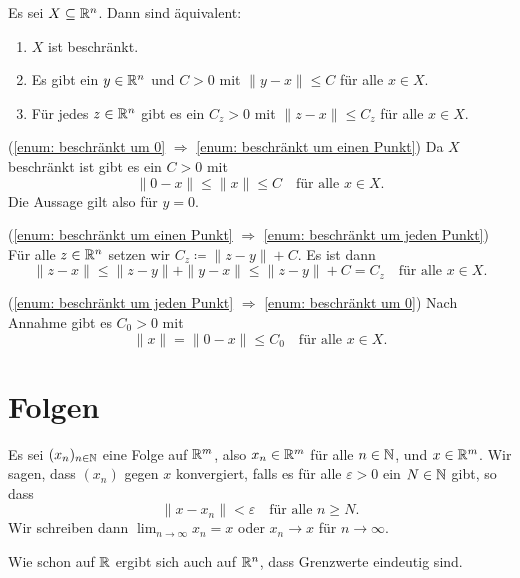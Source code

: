 \documentclass[a4paper,10pt]{article}
\begin{document}
\begin{question}
 Es sei $X \subseteq \mathbb{R}^n$. Dann sind äquivalent:
 \begin{enumerate}
  \item\label{enum: beschränkt um 0}
   $X$ ist beschränkt.
  \item\label{enum: beschränkt um einen Punkt}
   Es gibt ein $y \in \mathbb{R}^n$ und $C > 0$ mit $\|y-x\| \leq C$ für alle $x \in X$.
  \item\label{enum: beschränkt um jeden Punkt}
   Für jedes $z \in \mathbb{R}^n$ gibt es ein $C_z > 0$ mit $\|z-x\| \leq C_z$ für alle $x \in X$.
 \end{enumerate}
\end{question}
\begin{solution}
 (\ref{enum: beschränkt um 0} $\Rightarrow$ \ref{enum: beschränkt um einen Punkt}) Da $X$ beschränkt ist gibt es ein $C > 0$ mit
 \[
  \|0 - x\| \leq \|x\| \leq C
  \quad \text{für alle $x \in X$}.
 \]
 Die Aussage gilt also für $y = 0$.
 
 (\ref{enum: beschränkt um einen Punkt} $\Rightarrow$ \ref{enum: beschränkt um jeden Punkt}) Für alle $z \in \mathbb{R}^n$ setzen wir $C_z \coloneqq \|z-y\| + C$. Es ist dann
 \[
  \|z-x\| \leq \|z-y\| + \|y-x\| \leq \|z-y\| + C = C_z
  \quad 
  \text{für alle $x \in X$}.
 \]
 
 (\ref{enum: beschränkt um jeden Punkt} $\Rightarrow$ \ref{enum: beschränkt um 0}) Nach Annahme gibt es $C_0 > 0$ mit
 \[
  \|x\| = \|0-x\| \leq C_0
  \quad \text{für alle $x \in X$}.
 \]
\end{solution}





\section{Folgen}


\begin{defi}
 Es sei $(x_n)_{n \in \mathbb{N}}$ eine Folge auf $\mathbb{R}^m$, also $x_n \in \mathbb{R}^m$ für alle $n \in \mathbb{N}$, und $x \in \mathbb{R}^m$. Wir sagen, dass $(x_n)$ gegen $x$ konvergiert, falls es für alle $\varepsilon > 0$ ein $N \in \mathbb{N}$ gibt, so dass
 \[
  \|x - x_n\| < \varepsilon \quad \text{für alle $n \geq N$}.
 \]
 Wir schreiben dann $\lim_{n \to \infty} x_n = x$ oder $x_n \to x$ für $n \to \infty$.
\end{defi}


Wie schon auf $\mathbb{R}$ ergibt sich auch auf $\mathbb{R}^n$, dass Grenzwerte eindeutig sind.
\end{document}
